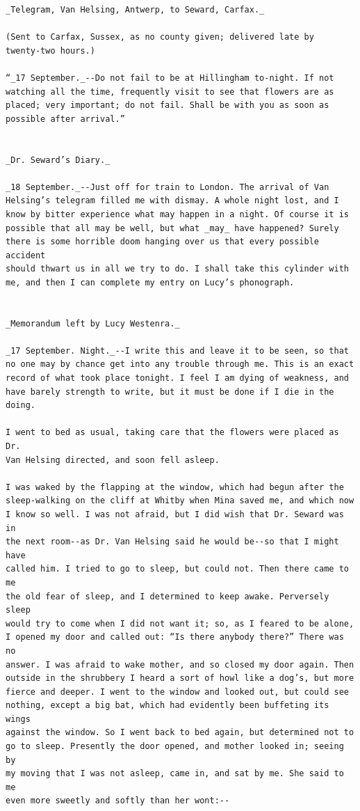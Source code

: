 \documentclass{article}
\begin{document}
\begin{verbatim}
_Telegram, Van Helsing, Antwerp, to Seward, Carfax._

(Sent to Carfax, Sussex, as no county given; delivered late by
twenty-two hours.)

“_17 September._--Do not fail to be at Hillingham to-night. If not
watching all the time, frequently visit to see that flowers are as
placed; very important; do not fail. Shall be with you as soon as
possible after arrival.”


_Dr. Seward’s Diary._

_18 September._--Just off for train to London. The arrival of Van
Helsing’s telegram filled me with dismay. A whole night lost, and I
know by bitter experience what may happen in a night. Of course it is
possible that all may be well, but what _may_ have happened? Surely
there is some horrible doom hanging over us that every possible accident
should thwart us in all we try to do. I shall take this cylinder with
me, and then I can complete my entry on Lucy’s phonograph.


_Memorandum left by Lucy Westenra._

_17 September. Night._--I write this and leave it to be seen, so that
no one may by chance get into any trouble through me. This is an exact
record of what took place tonight. I feel I am dying of weakness, and
have barely strength to write, but it must be done if I die in the
doing.

I went to bed as usual, taking care that the flowers were placed as Dr.
Van Helsing directed, and soon fell asleep.

I was waked by the flapping at the window, which had begun after the
sleep-walking on the cliff at Whitby when Mina saved me, and which now
I know so well. I was not afraid, but I did wish that Dr. Seward was in
the next room--as Dr. Van Helsing said he would be--so that I might have
called him. I tried to go to sleep, but could not. Then there came to me
the old fear of sleep, and I determined to keep awake. Perversely sleep
would try to come when I did not want it; so, as I feared to be alone,
I opened my door and called out: “Is there anybody there?” There was no
answer. I was afraid to wake mother, and so closed my door again. Then
outside in the shrubbery I heard a sort of howl like a dog’s, but more
fierce and deeper. I went to the window and looked out, but could see
nothing, except a big bat, which had evidently been buffeting its wings
against the window. So I went back to bed again, but determined not to
go to sleep. Presently the door opened, and mother looked in; seeing by
my moving that I was not asleep, came in, and sat by me. She said to me
even more sweetly and softly than her wont:--


\end{verbatim}
\end{document}
